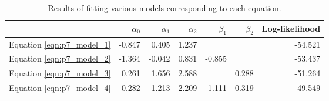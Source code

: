 \begin{table}[ht]
\centering
\begin{tabular}{rrrrrrr}
  \toprule
 & $\alpha_0$ & $\alpha_1$ & $\alpha_2$ & $\beta_1$ & $\beta_2$ & Log-likelihood \\ 
  \midrule
Equation \ref{eqn:p7_model_1} & -0.847 & 0.405 & 1.237 &  &  & -54.521 \\ 
  Equation \ref{eqn:p7_model_2} & -1.364 & -0.042 & 0.831 & -0.855 &  & -53.437 \\ 
  Equation \ref{eqn:p7_model_3} & 0.261 & 1.656 & 2.588 &  & 0.288 & -51.264 \\ 
  Equation \ref{eqn:p7_model_4} & -0.282 & 1.213 & 2.209 & -1.111 & 0.319 & -49.549 \\ 
   \bottomrule
\end{tabular}
\caption{Results of fitting various models corresponding to each equation.} 
\label{tab:p7_model_summary}
\end{table}

